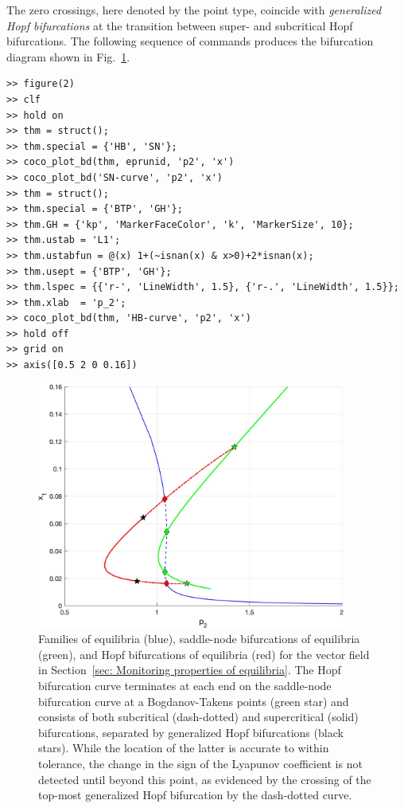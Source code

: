 The zero crossings, here denoted by the  point type, coincide with \textit{generalized Hopf bifurcations} at the transition between super- and subcritical Hopf bifurcations. The following sequence of commands produces the bifurcation diagram shown in Fig.~\ref{fig: Section7_2_1}.
\begin{lstlisting}[language=coco-highlight,frame=lines]
>> figure(2)
>> clf
>> hold on
>> thm = struct();
>> thm.special = {'HB', 'SN'};
>> coco_plot_bd(thm, eprunid, 'p2', 'x')
>> coco_plot_bd('SN-curve', 'p2', 'x')
>> thm = struct();
>> thm.special = {'BTP', 'GH'};
>> thm.GH = {'kp', 'MarkerFaceColor', 'k', 'MarkerSize', 10};
>> thm.ustab = 'L1';
>> thm.ustabfun = @(x) 1+(~isnan(x) & x>0)+2*isnan(x);
>> thm.usept = {'BTP', 'GH'};
>> thm.lspec = {{'r-', 'LineWidth', 1.5}, {'r-.', 'LineWidth', 1.5}};
>> thm.xlab  = 'p_2';
>> coco_plot_bd(thm, 'HB-curve', 'p2', 'x')
>> hold off
>> grid on
>> axis([0.5 2 0 0.16])
\end{lstlisting}
\begin{figure}[h]
\centering
\includegraphics[width=4in]{Figures/Section7_2_1.jpg}
\caption{Families of equilibria (blue), saddle-node bifurcations of equilibria (green), and Hopf bifurcations of equilibria (red) for the vector field in Section~\ref{sec: Monitoring properties of equilibria}. The Hopf bifurcation curve terminates at each end on the saddle-node bifurcation curve at a Bogdanov-Takens points (green star) and consists of both subcritical (dash-dotted) and supercritical (solid) bifurcations, separated by generalized Hopf bifurcations (black stars). While the location of the latter is accurate to within tolerance, the change in the sign of the Lyapunov coefficient is not detected until beyond this point, as evidenced by the crossing of the top-most generalized Hopf bifurcation by the dash-dotted curve.}
\label{fig: Section7_2_1}
\end{figure}

